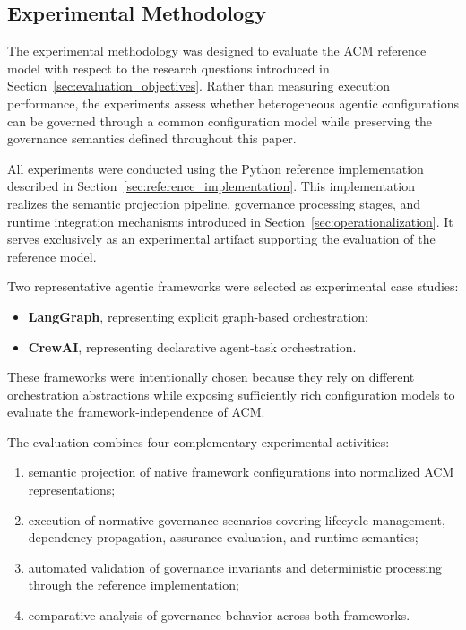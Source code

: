 \documentclass[10pt]{article}
\begin{document}
\subsection{Experimental Methodology}
\label{sec:evaluation_methodology}

The experimental methodology was designed to evaluate the ACM reference model with respect to the research questions introduced in Section~\ref{sec:evaluation_objectives}. Rather than measuring execution performance, the experiments assess whether heterogeneous agentic configurations can be governed through a common configuration model while preserving the governance semantics defined throughout this paper.

All experiments were conducted using the Python reference implementation described in Section~\ref{sec:reference_implementation}. This implementation realizes the semantic projection pipeline, governance processing stages, and runtime integration mechanisms introduced in Section~\ref{sec:operationalization}. It serves exclusively as an experimental artifact supporting the evaluation of the reference model.

Two representative agentic frameworks were selected as experimental case studies:

\begin{itemize}
\item \textbf{LangGraph}, representing explicit graph-based orchestration;
\item \textbf{CrewAI}, representing declarative agent-task orchestration.
\end{itemize}

These frameworks were intentionally chosen because they rely on different orchestration abstractions while exposing sufficiently rich configuration models to evaluate the framework-independence of ACM.

The evaluation combines four complementary experimental activities:

\begin{enumerate}

\item semantic projection of native framework configurations into normalized ACM representations;

\item execution of normative governance scenarios covering lifecycle management, dependency propagation, assurance evaluation, and runtime semantics;

\item automated validation of governance invariants and deterministic processing through the reference implementation;

\item comparative analysis of governance behavior across both frameworks.

\end{enumerate}
\end{document}
